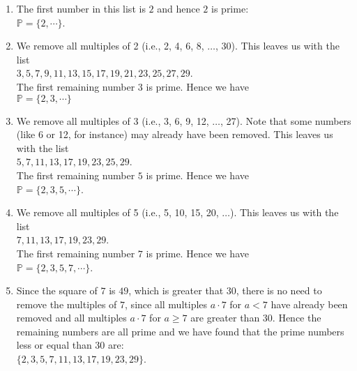 \begin{enumerate}
\item The first number in this list is $2$ and hence $2$ is prime:
      \\[0.2cm]
      \hspace*{1.3cm}
      $\mathbb{P} = \{ 2, \cdots \}$.
\item We remove all multiples of 2 (i.e., 2, 4, 6, 8, \(\ldots\), 30).  This leaves us with the list
      \\[0.2cm]
      \hspace*{1.3cm}
      $3, 5, 7, 9, 11, 13, 15, 17, 19, 21, 23, 25, 27, 29$.
      \\[0.2cm]
      The first remaining number $3$ is prime.  Hence we have
      \\[0.2cm]
      \hspace*{1.3cm}
      $\mathbb{P} = \{ 2, 3, \cdots \}$
\item We remove all multiples of 3 (i.e., 3, 6, 9, 12, \(\ldots\), 27).  Note that some numbers (like 6 or 12,
      for instance) may already have been removed.  This leaves us with the list
      \\[0.2cm]
      \hspace*{1.3cm}
      $5, 7, 11, 13, 17, 19, 23, 25, 29$.
      \\[0.2cm]
      The first remaining number $5$ is prime. Hence we have
      \\[0.2cm]
      \hspace*{1.3cm}
      $\mathbb{P} = \{ 2, 3, 5, \cdots \}$.
\item We remove all multiples of 5 (i.e., 5, 10, 15, 20, \(\ldots\)). This leaves us with the list
      \\[0.2cm]
      \hspace*{1.3cm}
      $7, 11, 13, 17, 19, 23, 29$.
      \\[0.2cm]
      The first remaining number $7$ is prime. Hence we have
      \\[0.2cm]
      \hspace*{1.3cm}
      $\mathbb{P} = \{ 2, 3, 5, 7, \cdots \}$.
\item Since the square of $7$ is $49$, which is greater that 30, there is no need to remove the multiples of
      $7$,  since all multiples $a \cdot 7$ for $a < 7$ have already been removed and all multiples $a \cdot 7$
      for $a \geq 7$ are greater than 30. Hence the remaining numbers are all prime and we have found that the
      prime numbers less or equal than 30 are: 
      \\[0.2cm]
      \hspace*{1.3cm}
      $\{ 2, 3, 5, 7, 11, 13, 17, 19, 23, 29\}$. 
\end{enumerate}

